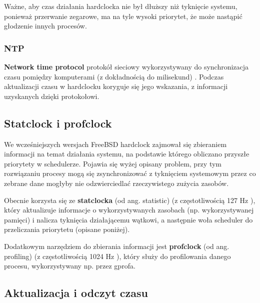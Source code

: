 \documentclass[shortabstract]{iithesis}
\theoremstyle{definition} \newtheorem*{definition}{Definicja}
\theoremstyle{definition} \newtheorem*{example}{Przykład}
\theoremstyle{definition} \newtheorem*{remark}{Uwaga}
\begin{document}
Ważne, aby czas działania hardclocka  nie był dłuższy niż tyknięcie systemu, ponieważ przerwanie zegarowe, ma na tyle wysoki priorytet, że może nastąpić głodzenie innych procesów.

\subsubsection{NTP}

\textbf{Network time protocol} protokół sieciowy wykorzystywany do synchronizacja czasu pomiędzy komputerami (z dokładnością do milisekund) \cite{bib:unp}. Podczas aktualizacji czasu w hardclocku koryguje się jego wskazania, z informacji uzyskanych dzięki protokołowi.

\subsection{Statclock i profclock}

We wcześniejszych wersjach FreeBSD hardclock zajmował się zbieraniem informacji na temat działania systemu, na podstawie którego obliczano przyszłe priorytety w schedulerze. Pojawia się wyżej opisany problem,  przy tym rozwiązaniu procesy mogą się zsynchronizować z tyknięciem systemowym przez co zebrane dane mogłyby nie odzwierciedlać rzeczywistego zużycia zasobów.

Obecnie korzysta się ze \textbf{statclocka} (od ang. statistic) (z częstotliwością 127 Hz \cite{bib:freebsd-os}), który aktualizuje informacje o wykorzystywanych zasobach (np. wykorzystywanej pamięci) i nalicza tyknięcia działającemu wątkowi, a następnie woła scheduler do przeliczania priorytetu (opisane poniżej).

Dodatkowym narzędziem do zbierania informacji jest \textbf{profclock} (od ang. profiling)  (z częstotliwością 1024 Hz \cite{bib:freebsd-os}), który służy do profilowania danego procesu, wykorzystywany np. przez gprofa.

\subsection{Aktualizacja i odczyt czasu}
\end{document}
